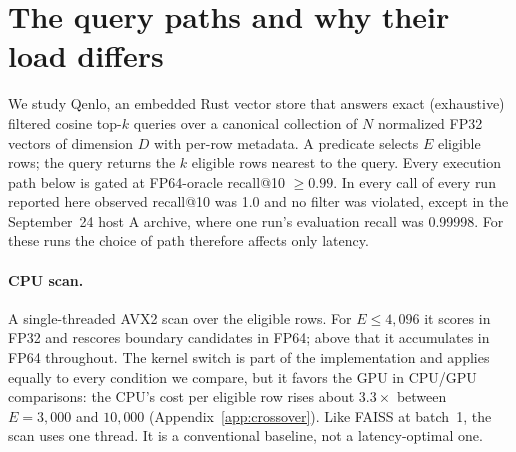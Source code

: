 
\section{The query paths and why their load differs}\label{sec:system}
We study Qenlo, an embedded Rust vector store that answers exact (exhaustive) filtered cosine top-$k$ queries over a canonical collection of $N$ normalized FP32 vectors of dimension $D$ with per-row metadata. A predicate selects $E$ eligible rows; the query returns the $k$ eligible rows nearest to the query. Every execution path below is gated at FP64-oracle recall@10 $\ge 0.99$. In every call of every run reported here observed recall@10 was 1.0 and no filter was violated, except in the September~24 host A archive, where one run's evaluation recall was 0.99998. For these runs the choice of path therefore affects only latency.

\paragraph{CPU scan.} A single-threaded AVX2 scan over the eligible rows. For $E\le 4{,}096$ it scores in FP32 and rescores boundary candidates in FP64; above that it accumulates in FP64 throughout. The kernel switch is part of the implementation and applies equally to every condition we compare, but it favors the GPU in CPU/GPU comparisons: the CPU's cost per eligible row rises about $3.3\times$ between $E=3{,}000$ and $10{,}000$ (Appendix~\ref{app:crossover}). Like FAISS at batch~1, the scan uses one thread. It is a conventional baseline, not a latency-optimal one.

